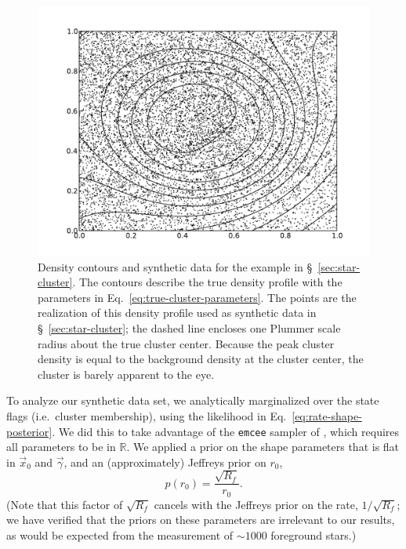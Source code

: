 \documentclass[aps,prd,reprint,nofootinbib]{revtex4-1}
\begin{document}
\begin{figure}
  \includegraphics[width=\columnwidth]{cluster-density}
  \caption{\label{fig:sky-density} Density contours and synthetic data
    for the example in \S~\ref{sec:star-cluster}.  The contours
    describe the true density profile with the parameters in
    Eq.~\eqref{eq:true-cluster-parameters}.  The points are the
    realization of this density profile used as synthetic data in
    \S~\ref{sec:star-cluster}; the dashed line encloses one Plummer
    scale radius about the true cluster center.  Because the peak
    cluster density is equal to the background density at the cluster
    center, the cluster is barely apparent to the eye.}
\end{figure}

To analyze our synthetic data set, we analytically marginalized over
the state flags (i.e.~cluster membership), using the likelihood in
Eq.~\eqref{eq:rate-shape-posterior}.  We did this to take advantage of
the \texttt{emcee} sampler of \citet{ForemanMackey2012}, which
requires all parameters to be in $\mathbb{R}$.  We applied a prior on
the shape parameters that is flat in $\vec{x}_0$ and $\vec{\gamma}$,
and an (approximately) Jeffreys prior on $r_0$,
\begin{equation}
  p\left( r_0 \right) = \frac{\sqrt{R_f}}{r_0}.
\end{equation}
(Note that this factor of $\sqrt{R_f}$ cancels with the Jeffreys prior
on the rate, $1/\sqrt{R_f}$; we have verified that the priors on these
parameters are irrelevant to our results, as would be expected from
the measurement of $\sim 1000$ foreground stars.)
\end{document}
